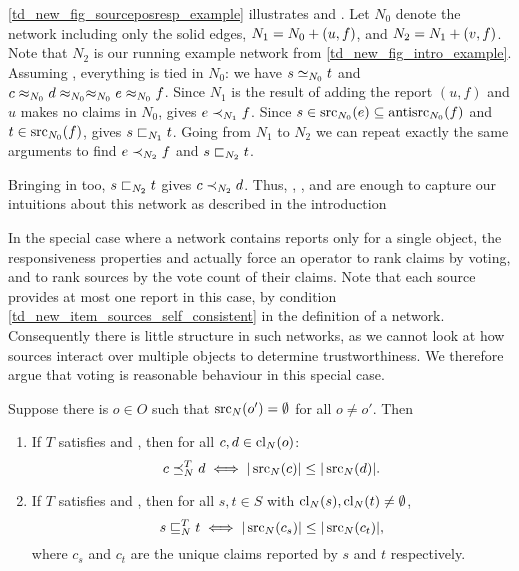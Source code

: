 \begin{example}
    \label{td_new_ex_posresps}
    \cref{td_new_fig_sourceposresp_example} illustrates \freshposresp{} and
    \sourceposresp{}. Let $N_0$ denote the network including only the solid
    edges, $N_1 = {N_0} + ({u}, {f})$, and $N_2 = {N_1} + ({v}, {f})$. Note
    that $N_2$ is our running example network from
    \cref{td_new_fig_intro_example}.
    Assuming \symmetry{}, everything is tied in $N_0$: we have $s \simeq_{N_0} t$
    and $c \approx_{N_0} d \approx_{N_0} \approx_{N_0} e \approx_{N_0} f$. Since $N_1$ is
    the result of adding the report $(u, f)$ and $u$ makes no claims in $N_0$,
    \freshposresp{} gives $e \prec_{N_1} f$. Since $s \in \operatorname{src}_{N_0}(e)
    \subseteq \operatorname{antisrc}_{N_0}(f)$ and $t \in \operatorname{src}_{N_0}(f)$, \sourceposresp{}
    gives $s \sqsubset_{N_1} t$. Going from $N_1$ to $N_2$ we can repeat exactly the
    same arguments to find $e \prec_{N_2} f$ and $s \sqsubset_{N_2} t$.

    Bringing \claimcoherence{} in too, $s \sqsubset_{N_2} t$ gives $c \prec_{N_2} d$.
    Thus, \claimcoherence{}, \symmetry{}, \freshposresp{} and \sourceposresp{}
    are enough to capture our intuitions about this network as described in the
    introduction 
\end{example}

In the special case where a network contains reports only for a single object,
the responsiveness properties and \symmetry{} actually force an operator to
rank claims by voting, and to rank sources by the vote count of their claims.
Note that each source provides at most one report in this case, by condition
\cref{td_new_item_sources_self_consistent} in the definition of a network.
Consequently there is little structure in such networks, as we cannot look at
how sources interact over multiple objects to determine trustworthiness. We
therefore argue that voting is reasonable behaviour in this special case.

\begin{proposition}
    \label{td_new_prop_symm_fpr_single_object_voting}
    Suppose there is $o \in O$ such that $\operatorname{src}_N(o') = \emptyset$ for all $o
    \ne o'$. Then
    \begin{enumerate}
        \item\label{td_new_item_prop_symm_fpr_single_object_voting_claims}
        If $T$ satisfies \symmetry{} and \freshposresp{}, then for all $c, d
            \in \operatorname{cl}_N(o)$:
        \[
            c \preceq_N^T d \iff |\operatorname{src}_N(c)| \le |\operatorname{src}_N(d)|.
        \]
        \item\label{td_new_item_prop_symm_fpr_single_object_voting_sources}
        If $T$ satisfies \symmetry{} and \sourceposresp{}, then for all $s, t
            \in S$ with $\operatorname{cl}_N(s), \operatorname{cl}_N(t) \ne \emptyset$,
        \[
            s \sqsubseteq_N^T t
            \iff
            |\operatorname{src}_N(c_s)| \le |\operatorname{src}_N(c_t)|,
        \]
        where $c_s$ and $c_t$ are the unique claims reported by $s$ and $t$
        respectively.
    \end{enumerate}
\end{proposition}

